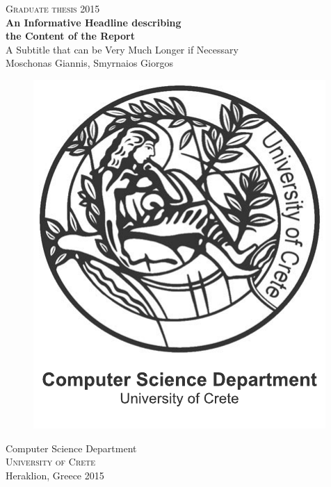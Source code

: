 \newpage
\thispagestyle{empty}
\begin{center}
	\textsc{\large Graduate thesis 2015}\\[4cm]		%
	\textbf{\Large An Informative Headline describing\\ the Content of the Report} \\[1cm]
	{\large A Subtitle that can be Very Much Longer if Necessary}\\[1cm]
	{\large Moschonas Giannis, Smyrnaios Giorgos}
	
	\vfill	
	\begin{figure}[H]
	\centering
	\includegraphics[width=0.2\pdfpagewidth]{figure/auxiliary/logo_eng.pdf} \\	
	\end{figure}	\vspace{5mm}	
	
	Computer Science Department \\
	\textsc{University of Crete} \\
	Heraklion, Greece 2015 \\
\end{center}


